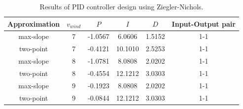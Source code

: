 \begin{table}[H]
    \caption{Results of PID controller design using Ziegler-Nichols.}
    \centering
    \begin{tabular}{cccccc} \toprule
        Approximation & $v_{wind}$ &$P$ & $I$ & $D$ & Input-Output pair \\ \midrule
        max-slope     & 7 & -1.0567 & 6.0606  & 1.5152 & 1-1 \\
        two-point     & 7 & -0.4121 & 10.1010 & 2.5253 & 1-1 \\
        max-slope     & 8 & -1.0781 & 8.0808  & 2.0202 & 1-1 \\
        two-point     & 8 & -0.4554 & 12.1212 & 3.0303 & 1-1 \\
        max-slope     & 9 & -0.1923 & 8.0808  & 2.0202 & 1-1 \\
        two-point     & 9 & -0.0844 & 12.1212 & 3.0303 & 1-1 \\ \bottomrule
    \end{tabular}
    \label{tab:condes:ZN:results}
\end{table}

